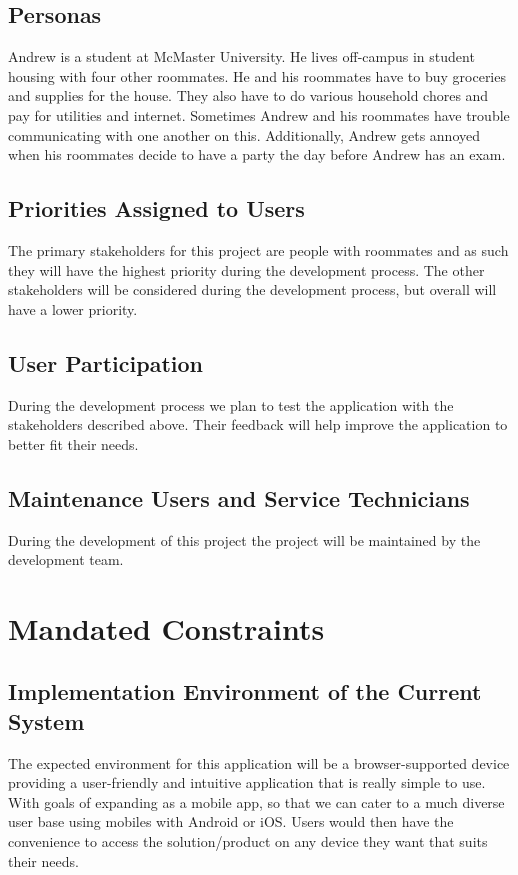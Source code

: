 \documentclass[12pt]{article}
\begin{document}
\subsection{Personas}
Andrew is a student at McMaster University. He lives off-campus in student housing with four other roommates. He and his roommates have to buy groceries and supplies for the house. They also have to do various household chores and pay for utilities and internet. Sometimes Andrew and his roommates have trouble communicating with one another on this. Additionally, Andrew gets annoyed when his roommates decide to have a party the day before Andrew has an exam.

\subsection{Priorities Assigned to Users}

The primary stakeholders for this project are people with roommates and as such they will have the highest priority during the development process. The other stakeholders will be considered during the development process, but overall will have a lower priority.

\subsection{User Participation}

During the development process we plan to test the application with the stakeholders described above. Their feedback will help improve the application to better fit their needs.

\subsection{Maintenance Users and Service Technicians}

During the development of this project the project will be maintained by the development team.

\section{Mandated Constraints}


\subsection{Implementation Environment of the Current System}

The expected environment for this application will be a browser-supported device providing a user-friendly and intuitive application that is really simple to use. With goals of expanding as a mobile app, so that we can cater to a much diverse user base using mobiles with Android or iOS. Users would then have the convenience to access the solution/product on any device they want that suits their needs. 
\end{document}
